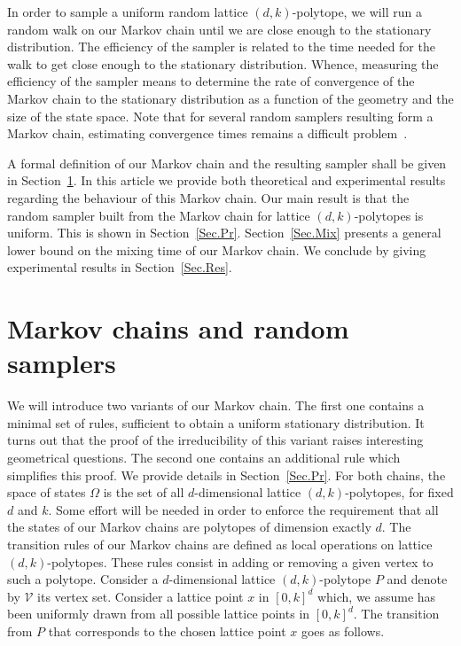 \documentclass[a4paper]{article}
\begin{document}
In order to sample a uniform random lattice $(d,k)$-polytope, we will run a random walk on our Markov chain until we are close enough to the stationary distribution. The efficiency of the sampler is related to the time needed for the walk to get close enough to the stationary distribution. Whence, measuring the efficiency of the sampler means to determine the rate of convergence of the Markov chain to the stationary distribution as a function of the geometry and the size of the state space. Note that for several random samplers resulting form a Markov chain, estimating convergence times remains a difficult problem~\cite{carnino2011random,melanccon2001random}.

A formal definition of our Markov chain and the resulting sampler shall be given in Section~\ref{Sec.MC}. In this article we provide both theoretical and experimental results regarding the behaviour of this Markov chain. Our main result is that the random sampler built from the Markov chain for lattice $(d,k)$-polytopes is uniform. This is shown in Section~\ref{Sec.Pr}. Section~\ref{Sec.Mix} presents a general lower bound on the mixing time of our Markov chain. We conclude by giving experimental results in Section~\ref{Sec.Res}.

\section{Markov chains and random samplers}\label{Sec.MC}

We will introduce two variants of our Markov chain. The first one contains a minimal set of rules, sufficient to obtain a uniform stationary distribution. It turns out that the proof of the irreducibility of this variant raises interesting geometrical questions. The second one contains an additional rule which simplifies this proof. We provide details in Section~\ref{Sec.Pr}. For both chains, the space of states $\Omega$ is the set of all $d$-dimensional lattice $(d,k)$-polytopes, for fixed $d$ and $k$. Some effort will be needed in order to enforce the requirement that all the states of our Markov chains are polytopes of dimension exactly $d$. The transition rules of our Markov chains are defined as local operations on lattice $(d,k)$-polytopes. These rules consist in adding or removing a given vertex to such a polytope. Consider a $d$-dimensional lattice $(d,k)$-polytope $P$ and denote by $\mathcal{V}$ its vertex set. Consider a lattice point $x$ in $[0,k]^d$ which, we assume has been uniformly drawn from all possible lattice points in $[0,k]^d$. The transition from $P$ that corresponds to the chosen lattice point $x$ goes as follows.
\end{document}
